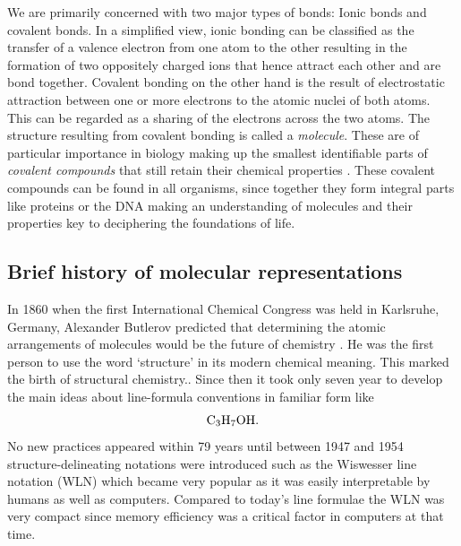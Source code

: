 We are primarily concerned with two major types of bonds: Ionic bonds and covalent bonds.
In a simplified view, ionic bonding can be classified  as the transfer of a valence electron from one atom to the other resulting in the formation of two oppositely charged ions that hence attract each other and are bond together. Covalent bonding on the other hand is the result of electrostatic attraction between one or more electrons to the atomic nuclei of both atoms. This can be regarded as a sharing of the electrons across the two atoms. The structure resulting from covalent bonding is called a \emph{molecule}. These are of particular importance in biology making up the smallest identifiable parts of \emph{covalent compounds} that still retain their chemical properties \cite{molecules}. These covalent compounds can be found in all organisms, since together they form integral parts like proteins or the DNA making an understanding of molecules and their properties key to deciphering the foundations of life.


\subsection{Brief history of molecular representations}
In 1860 when the first International Chemical Congress was held in Karlsruhe, Germany, Alexander Butlerov predicted that determining the atomic arrangements of molecules would be the future of chemistry \citep{butlerov1861einiges}. He was the first person to use the word `structure' in its modern chemical meaning. This marked the birth of structural chemistry.\citep{wiswesser1968107}. Since then it took only seven year to develop the main ideas about line-formula conventions in familiar form like $$\mathrm{C_3H_7OH}.$$
No new practices appeared within 79 years until between 1947 and 1954 structure-delineating notations were introduced such as the Wiswesser line notation (WLN) which became very popular as it was easily interpretable by humans as well as computers. Compared to today's line formulae the WLN was very compact since memory efficiency was a critical factor in computers at that time.


